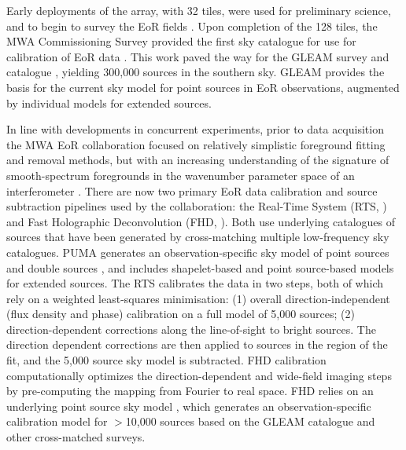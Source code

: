 Early deployments of the array, with 32 tiles, were used for preliminary science, and to begin to survey the EoR fields \cite{2012ApJ...755...47W}. Upon completion of the 128 tiles, the MWA Commissioning Survey provided the first sky catalogue for use for calibration of EoR data \cite{2014PASA...31...45H}. This work paved the way for the GLEAM survey \cite{wayth15} and catalogue \cite{hurleywalker16}, yielding 300,000 sources in the southern sky. GLEAM provides the basis for the current sky model for point sources in EoR observations, augmented by individual models for extended sources.

In line with developments in concurrent experiments, prior to data acquisition the MWA EoR collaboration focused on relatively simplistic foreground fitting and removal methods, but with an increasing understanding of the signature of smooth-spectrum foregrounds in the wavenumber parameter space of an interferometer \cite{2009ApJ...695..183B,datta10,trott12}.
There are now two primary EoR data calibration and source subtraction pipelines used by the collaboration: the Real-Time System (RTS, \cite{mitchell08}) and Fast Holographic Deconvolution (FHD, \cite{2012ApJ...759...17S}). Both use underlying catalogues of sources that have been generated by cross-matching multiple low-frequency sky catalogues. PUMA \cite{line17} generates an observation-specific sky model of point sources and double sources \cite{procopio15}, and includes shapelet-based and point source-based models for extended sources. The RTS calibrates the data in two steps, both of which rely on a weighted least-squares minimisation: (1) overall direction-independent (flux density and phase) calibration on a full model of 5,000 sources; (2) direction-dependent corrections along the line-of-sight to bright sources. The direction dependent corrections are then applied to sources in the region of the fit, and the 5,000 source sky model is subtracted.
FHD calibration \cite{2012ApJ...759...17S} computationally optimizes the direction-dependent and wide-field imaging steps by pre-computing the mapping from Fourier to real space. FHD relies on an underlying point source sky model \cite{2016MNRAS.461.4151C}, which generates an observation-specific calibration model for $>$10,000 sources based on the GLEAM catalogue and other cross-matched surveys.

